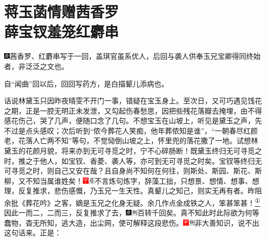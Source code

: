 

\chapter{蒋玉菡情赠茜香罗\\薛宝钗羞笼红麝串}

{\includegraphics[width=3mm]{../Images/00004}\kaishu 茜香罗、红麝串写于一回，盖琪官虽系优人，后回与袭人供奉玉兄宝卿得同终始者，非泛泛之文也。}

{\kaishu 自``闻曲''回以后，回回写药方，是白描颦儿添病也。}

话说林黛玉只因昨夜晴雯不开门一事，错疑在宝玉身上。至次日，又可巧遇见饯花之期，正是一腔无明正未发泄，又勾起伤春愁思，因把些残花落瓣去掩埋，由不得感花伤己，哭了几声，便随口念了几句。不想宝玉在山坡上，听见是黛玉之声，先不过是点头感叹；次后听到``侬今葬花人笑痴，他年葬侬知是谁''，``一朝春尽红颜老，花落人亡两不知''等句，不觉恸倒山坡之上，怀里兜的落花撒了一地。试想林黛玉的花颜月貌，将来亦到无可寻觅之时，宁不心碎肠断！既黛玉终归无可寻觅之时，推之于他人，如宝钗、香菱、袭人等，亦可到无可寻觅之时矣。宝钗等终归无可寻觅之时，则自己又安在哉？且自身尚不知何在何往，则斯处、斯园、斯花、斯柳，又不知当属谁姓矣！{\includegraphics[width=3mm]{../Images/00002}\includegraphics[width=3mm]{../Images/00010}\footnotesize \kaishu 不言炼句炼字，辞藻工拙，只想景、想情、想事、想理，反复推求，悲伤感慨，乃玉兄一生天性。真颦儿之知己，则实无再有者。昨阻余批《葬花吟》之客，嫡是玉兄之化身无疑。余几作点金成铁之人，笨甚笨甚！}\href{../Text/part0032_split_000.html\#lnkback_1_a}{\textsuperscript{①}}因此一而二，二而三，反复推求了去，{\includegraphics[width=3mm]{../Images/00004}\includegraphics[width=3mm]{../Images/00011}\footnotesize \kaishu 百转千回矣。}真不知此时此际欲为何等蠢物，杳无所知，逃大造，出尘网，使可解释这段悲伤。{\includegraphics[width=3mm]{../Images/00002}\includegraphics[width=3mm]{../Images/00011}\footnotesize \kaishu 非大善知识，说不出这句话来。}正是：

